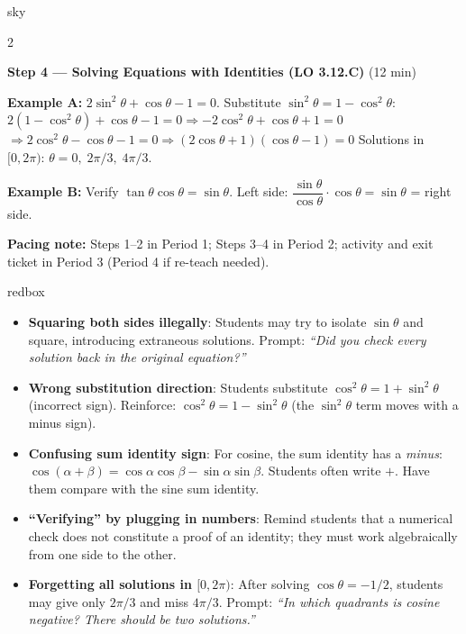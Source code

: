 \documentclass[10pt]{article}
\begin{document}
\begin{skillbox}{sky}
\begin{multicols}{2}
\columnbreak

\textbf{Step 4 --- Solving Equations with Identities (LO 3.12.C)} (12 min)

\textbf{Example A:} $2\sin^2\theta + \cos\theta - 1 = 0$.
Substitute $\sin^2\theta = 1 - \cos^2\theta$:
$2(1-\cos^2\theta)+\cos\theta-1=0 \Rightarrow -2\cos^2\theta + \cos\theta + 1 = 0$
$\Rightarrow 2\cos^2\theta - \cos\theta - 1 = 0 \Rightarrow (2\cos\theta+1)(\cos\theta-1)=0$
Solutions in $[0,2\pi)$: $\theta = 0,\; 2\pi/3,\; 4\pi/3$.

\textbf{Example B:} Verify $\tan\theta\cos\theta = \sin\theta$.
Left side: $\dfrac{\sin\theta}{\cos\theta}\cdot\cos\theta = \sin\theta$ = right side.

\end{multicols}

\smallskip
\textbf{Pacing note:} Steps 1--2 in Period 1; Steps 3--4 in Period 2;
activity and exit ticket in Period 3 (Period 4 if re-teach needed).
\end{skillbox}

\vspace{0.08in}

\begin{skillbox}{redbox}
\begin{itemize}[leftmargin=1.4em, itemsep=3pt]
  \item \textbf{Squaring both sides illegally}: Students may try to isolate
    $\sin\theta$ and square, introducing extraneous solutions. Prompt:
    \textit{``Did you check every solution back in the original equation?''}
  \item \textbf{Wrong substitution direction}: Students substitute
    $\cos^2\theta = 1 + \sin^2\theta$ (incorrect sign). Reinforce:
    $\cos^2\theta = 1 - \sin^2\theta$ (the $\sin^2\theta$ term moves with a minus sign).
  \item \textbf{Confusing sum identity sign}: For cosine, the sum identity has a
    \emph{minus}: $\cos(\alpha+\beta) = \cos\alpha\cos\beta - \sin\alpha\sin\beta$.
    Students often write $+$. Have them compare with the sine sum identity.
  \item \textbf{``Verifying'' by plugging in numbers}: Remind students that a
    numerical check does not constitute a proof of an identity; they must work
    algebraically from one side to the other.
  \item \textbf{Forgetting all solutions in $[0, 2\pi)$}:
    After solving $\cos\theta = -1/2$, students may give only $2\pi/3$ and miss $4\pi/3$.
    Prompt: \textit{``In which quadrants is cosine negative? There should be two solutions.''}
\end{itemize}
\end{skillbox}
\end{document}
